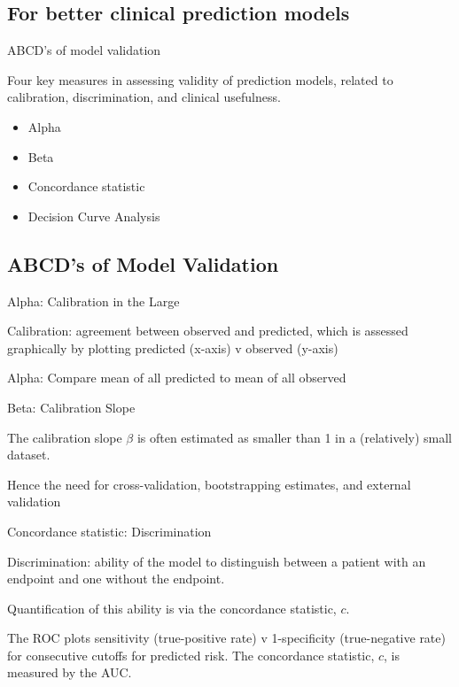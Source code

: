 \documentclass[10pt,ignorenonframetext,]{beamer}
\providecommand{\tightlist}{%
\setlength{\itemsep}{0pt}\setlength{\parskip}{0pt}}
\begin{document}
\subsection{For better clinical prediction
models}\label{for-better-clinical-prediction-models-1}

\begin{frame}{ABCD's of model validation}

Four key measures in assessing validity of prediction models, related to
calibration, discrimination, and clinical usefulness.

\begin{itemize}[<+->]
\tightlist
\item
  Alpha
\item
  Beta
\item
  Concordance statistic
\item
  Decision Curve Analysis
\end{itemize}

\end{frame}

\subsection{ABCD's of Model
Validation}\label{abcds-of-model-validation-1}

\begin{frame}{Alpha: Calibration in the Large}

Calibration: agreement between observed and predicted, which is assessed
graphically by plotting predicted (x-axis) v observed (y-axis)

Alpha: Compare mean of all predicted to mean of all observed

\end{frame}

\begin{frame}{Beta: Calibration Slope}

The calibration slope \(\beta\) is often estimated as smaller than 1 in
a (relatively) small dataset.

Hence the need for cross-validation, bootstrapping estimates, and
external validation

\end{frame}

\begin{frame}{Concordance statistic: Discrimination}

Discrimination: ability of the model to distinguish between a patient
with an endpoint and one without the endpoint.

Quantification of this ability is via the concordance statistic, \(c\).

The ROC plots sensitivity (true-positive rate) v 1-specificity
(true-negative rate) for consecutive cutoffs for predicted risk. The
concordance statistic, \(c\), is measured by the AUC.

\end{frame}
\end{document}
